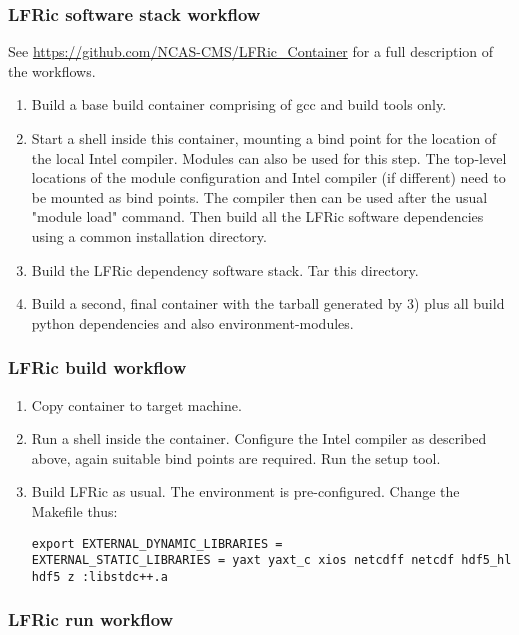 \documentclass[12pt]{article}
\begin{document}
\subsubsection*{LFRic software stack workflow}
See \url{https://github.com/NCAS-CMS/LFRic_Container} for a full description of the workflows.
\begin{enumerate}
\item Build a base build container comprising of gcc and build tools only.

\item Start a shell inside this container, mounting a bind point for the location of the local Intel compiler. Modules can also be used for this step. The top-level locations of the module configuration and Intel compiler (if different) need to be mounted as bind points. The compiler then can be used after the usual "module load" command. Then build all the LFRic software dependencies using a common installation directory.

\item Build the LFRic dependency software stack. Tar this directory.

\item Build a second, final container with the tarball generated by 3) plus all build python dependencies and also environment-modules.
\end{enumerate}

\subsubsection*{LFRic build workflow}

\begin{enumerate}
\item Copy container to target machine.
\item Run a shell inside the container. Configure the Intel compiler as described above, again suitable bind points are required. Run the setup tool.
\item Build LFRic as usual. The environment is pre-configured. Change the Makefile thus:
\begin{lstlisting}[breaklines]
export EXTERNAL_DYNAMIC_LIBRARIES =
EXTERNAL_STATIC_LIBRARIES = yaxt yaxt_c xios netcdff netcdf hdf5_hl hdf5 z :libstdc++.a
\end{lstlisting}
\end{enumerate}

\subsubsection*{LFRic run workflow}
\end{document}
